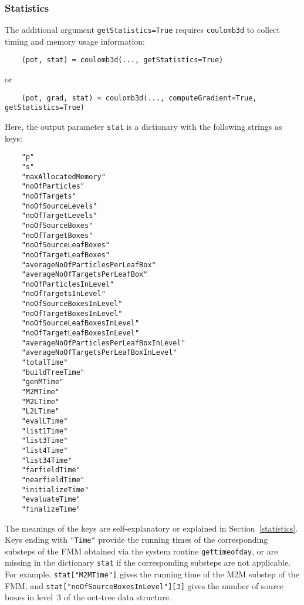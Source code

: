 \subsubsection*{Statistics}
The additional argument \verb|getStatistics=True| requires
\verb|coulomb3d| to collect timing and memory usage information:
\begin{verbatim}
    (pot, stat) = coulomb3d(..., getStatistics=True)
\end{verbatim}
or
\begin{verbatim}
    (pot, grad, stat) = coulomb3d(..., computeGradient=True, getStatistics=True)
\end{verbatim}
Here, the output parameter \verb|stat| is a dictionary with the following strings as keys:
\begin{verbatim}
    "p"
    "s"
    "maxAllocatedMemory"
    "noOfParticles"
    "noOfTargets"
    "noOfSourceLevels"
    "noOfTargetLevels"
    "noOfSourceBoxes"
    "noOfTargetBoxes"
    "noOfSourceLeafBoxes"
    "noOfTargetLeafBoxes"
    "averageNoOfParticlesPerLeafBox"
    "averageNoOfTargetsPerLeafBox"
    "noOfParticlesInLevel"
    "noOfTargetsInLevel"
    "noOfSourceBoxesInLevel"
    "noOfTargetBoxesInLevel"
    "noOfSourceLeafBoxesInLevel"
    "noOfTargetLeafBoxesInLevel"
    "averageNoOfParticlesPerLeafBoxInLevel"
    "averageNoOfTargetsPerLeafBoxInLevel"
    "totalTime"
    "buildTreeTime"
    "genMTime"
    "M2MTime"
    "M2LTime"
    "L2LTime"
    "evalLTime"
    "list1Time"
    "list3Time"
    "list4Time"
    "list34Time"
    "farfieldTime"
    "nearfieldTime"
    "initializeTime"
    "evaluateTime"
    "finalizeTime"
\end{verbatim}
The meanings of the keys are self-explanatory or explained
in Section~\ref{statistics}. Keys ending with \verb|"Time"|
provide the running times of the corresponding substeps of the 
FMM obtained via the system routine \verb|gettimeofday|, or
are missing in the dictionary \verb|stat| if the corresponding
substeps are not applicable.
For example, \verb|stat["M2MTime"]| gives the running time
of the M2M substep of the FMM, and
\verb|stat["noOfSourceBoxesInLevel"][3]| gives the
number of source boxes in level~3 of the oct-tree data structure.
    
